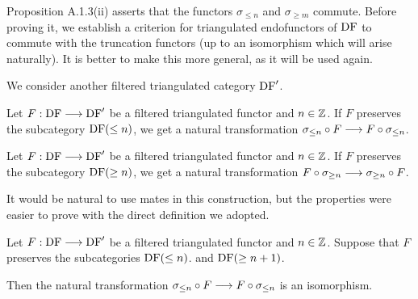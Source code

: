 Proposition A.1.3(ii) asserts that the functors $\sigma_{\le n}$ and $\sigma_{\ge m}$ commute.
Before proving it, we establish a criterion for triangulated endofunctors of $\operatorname{DF}$
to commute with the truncation functors (up to an isomorphism which will arise naturally).
It is better to make this more general, as it will be used again.

We consider another filtered triangulated category $\operatorname{DF}'$.

\begin{definition}
\label{def-commute_truncLE}
\leanok
{}

Let $F:\operatorname{DF}\longrightarrow\operatorname{DF}'$ be a filtered triangulated functor
and $n\in\mathbb{Z}$. If $F$ preserves the subcategory $\operatorname{DF}(\le n)$, we 
get a natural transformation
$\sigma_{\le n} \circ F \longrightarrow F \circ\sigma_{\le n}$.

\end{definition}


\begin{definition}
\label{def-commute_truncGE}
\leanok
{}

Let $F:\operatorname{DF}\longrightarrow\operatorname{DF}'$ be a filtered triangulated functor
and $n\in\mathbb{Z}$. If $F$ preserves the subcategory $\operatorname{DF}(\ge n)$, we 
get a natural transformation
$F \circ\sigma_{\ge n} \longrightarrow \sigma_{\ge n} \circ F$.

\end{definition}

\begin{remark}
It would be natural to use mates in this construction, but the properties were easier to prove with the direct definition
we adopted.
\end{remark}


\begin{proposition}
\label{prop-commute_truncLE_iso}
\leanok
{}

Let $F:\operatorname{DF}\longrightarrow\operatorname{DF}'$ be a filtered triangulated functor
and $n\in\mathbb{Z}$. Suppose that $F$ preserves the subcategories $\operatorname{DF}(\le n)$.
and $\operatorname{DF}(\ge n + 1)$.

Then the natural transformation
$\sigma_{\le n} \circ F \longrightarrow F \circ\sigma_{\le n}$ is an isomorphism.

\end{proposition}



